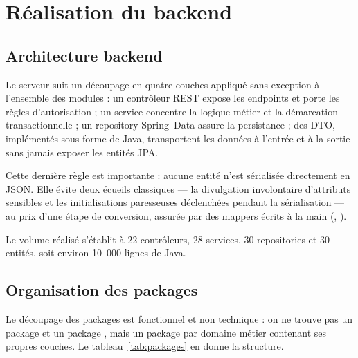 \chapter{Réalisation du backend}
\label{ch:backend}

\section{Architecture backend}

Le serveur suit un découpage en quatre couches appliqué sans exception à l'ensemble des
modules : un contrôleur REST expose les endpoints et porte les règles d'autorisation ; un
service concentre la logique métier et la démarcation transactionnelle ; un repository
Spring~Data assure la persistance ; des DTO, implémentés sous forme de  Java,
transportent les données à l'entrée et à la sortie sans jamais exposer les entités JPA.

Cette dernière règle est importante : aucune entité n'est sérialisée directement en JSON.
Elle évite deux écueils classiques --- la divulgation involontaire d'attributs sensibles et
les initialisations paresseuses déclenchées pendant la sérialisation --- au prix d'une
étape de conversion, assurée par des mappers écrits à la main (, ).

Le volume réalisé s'établit à 22 contrôleurs, 28 services, 30 repositories et 30 entités,
soit environ 10~000 lignes de Java.

\section{Organisation des packages}

Le découpage des packages est fonctionnel et non technique : on ne trouve pas un package
 et un package , mais un package par domaine métier
contenant ses propres couches. Le tableau~\ref{tab:packages} en donne la structure.


